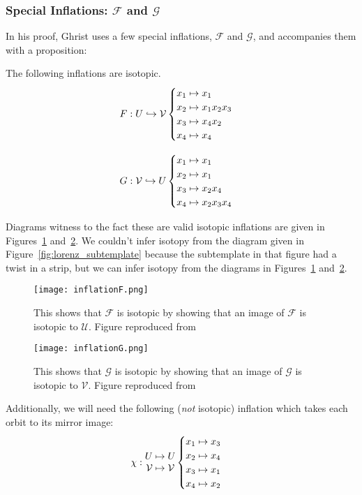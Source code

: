 \documentclass[paper.tex]{subfiles}
\begin{document}
\subsubsection{Special Inflations: $\mathcal{F}$ and $\mathcal{G}$}

In his proof, Ghrist uses a few special inflations, $\mathcal{F}$ and $\mathcal{G}$, and accompanies them with a proposition:

\begin{prop}
    The following inflations are isotopic.
$$F: U \hookrightarrow \mathcal{V} \begin{cases} x_1 \mapsto x_1 \\ x_2 \mapsto x_1 x_2 x_3 \\ x_3 \mapsto x_4 x_2 \\ x_4 \mapsto x_4 \end{cases}$$

$$G: \mathcal{V} \hookrightarrow U \begin{cases} x_1 \mapsto x_1 \\ x_2 \mapsto x_1 \\ x_3 \mapsto x_2 x_4 \\ x_4 \mapsto x_2 x_3 x_4 \end{cases}$$
\end{prop}

Diagrams witness to the fact these are valid isotopic inflations are given in Figures~\ref{fig:isotopicF} and~\ref{fig:isotopicG}. We couldn't infer isotopy from the diagram given in Figure~\ref{fig:lorenz_subtemplate}
because the subtemplate in that figure had a twist in a strip, but we can infer isotopy from the diagrams in Figures~\ref{fig:isotopicF} and~\ref{fig:isotopicG}.


\begin{figure}[h]
  \centering
  \texttt{[image: inflationF.png]}
  \caption{This shows that $\mathcal{F}$ is isotopic by showing that an image of $\mathcal{F}$ is isotopic to $\mathcal{U}$. Figure reproduced from~\cite{ghs1997}}\label{fig:isotopicF}
\end{figure}

\begin{figure}[h]
  \centering
  \texttt{[image: inflationG.png]}
  \caption{This shows that $\mathcal{G}$ is isotopic by showing that an image of $\mathcal{G}$ is isotopic to $\mathcal{V}$.  Figure reproduced from~\cite{ghs1997}}\label{fig:isotopicG}
\end{figure}


Additionally, we will need the following (\emph{not} isotopic) inflation which takes each orbit to its mirror image: $$\chi: \begin{matrix} U \mapsto U \\ \mathcal{V} \mapsto \mathcal{V} \end{matrix} \begin{cases} x_1 \mapsto x_3 \\ x_2 \mapsto x_4 \\ x_3 \mapsto x_1 \\ x_4 \mapsto x_2 \end{cases}$$
\end{document}
